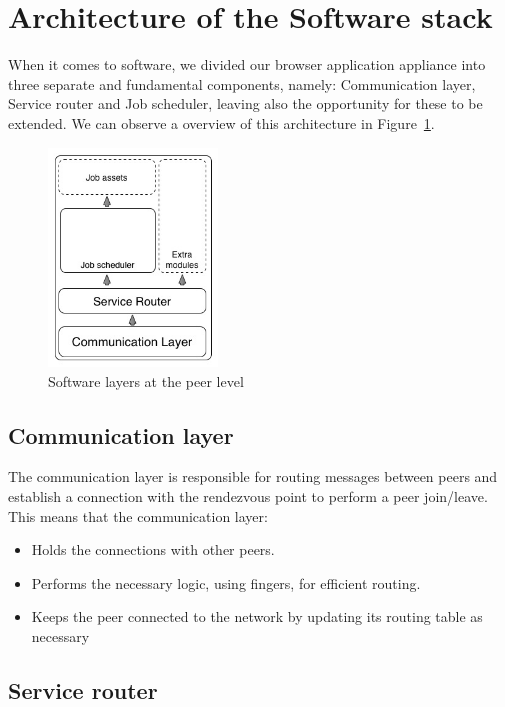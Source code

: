 \section{Architecture of the Software stack}

When it comes to software, we divided our browser application appliance into three separate and fundamental components, namely: Communication layer, Service router and Job scheduler, leaving also the opportunity for these to be extended. We can observe a overview of this architecture in Figure~\ref{fig:s-a-n-l}.

\begin{figure}[h!]
  \centering
  \includegraphics[width=0.4\textwidth]{figs/software-architecture-node-level}
  \caption{Software layers at the peer level}
  \label{fig:s-a-n-l}
\end{figure}


\subsection{Communication layer}

The communication layer is responsible for routing messages between peers and establish a connection with the rendezvous point to perform a peer join/leave. This means that the communication layer:

\begin{itemize}
    \item Holds the connections with other peers.
    \item Performs the necessary logic, using fingers, for efficient routing.
    \item Keeps the peer connected to the network by updating its routing table as necessary
\end{itemize}

\subsection{Service router}

